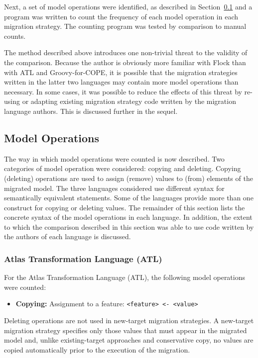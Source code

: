 Next, a set of model operations were identified, as described in Section~\ref{subsubsec:quantitive_model_operations} and a program was written to count the frequency of each model operation in each migration strategy. The counting program was tested by comparison to manual counts.

The method described above introduces one non-trivial threat to the validity of the comparison. Because the author is obviously more familiar with Flock than with ATL and Groovy-for-COPE, it is possible that the migration strategies written in the latter two languages may contain more model operations than necessary. In some cases, it was possible to reduce the effects of this threat by re-using or adapting existing migration strategy code written by the migration language authors. This is discussed further in the sequel.

\subsection{Model Operations}
\label{subsubsec:quantitive_model_operations}
The way in which model operations were counted is now described. Two categories of model operation were considered: copying and deleting. Copying (deleting) operations are used to assign (remove) values to (from) elements of the migrated model. The three languages considered use different syntax for semantically equivalent statements. Some of the languages provide more than one construct for copying or deleting values. The remainder of this section lists the concrete syntax of the model operations in each language. In addition, the extent to which the comparison described in this section was able to use code written by the authors of each language is discussed.

\subsubsection{Atlas Transformation Language (ATL)}
For the Atlas Transformation Language (ATL), the following model operations were counted:
	
\begin{itemize}
	\item \textbf{Copying:} Assignment to a feature:
	\subitem \texttt{<feature> <- <value>} 
\end{itemize}

Deleting operations are not used in new-target migration strategies. A new-target migration strategy specifies only those values that must appear in the migrated model and, unlike existing-target approaches and conservative copy, no values are copied automatically prior to the execution of the migration.


